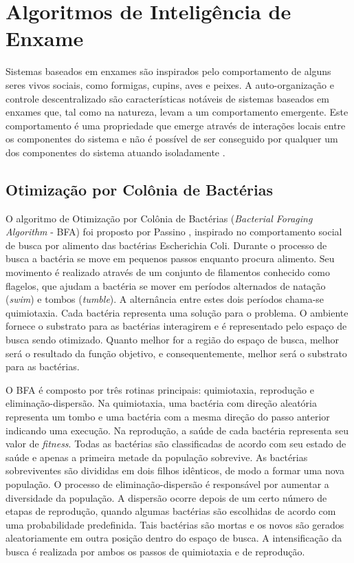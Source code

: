 \section{Algoritmos de Inteligência de Enxame}
\label{sec:swarm_intelligence_algorithms}
Sistemas baseados em enxames são inspirados pelo comportamento de alguns seres vivos sociais, como formigas, cupins, aves e peixes. A auto-organização e controle descentralizado são características notáveis de sistemas baseados em enxames que, tal como na natureza, levam a um comportamento emergente. Este comportamento é uma propriedade que emerge através de interações locais entre os componentes do sistema e não é possível de ser conseguido por qualquer um dos componentes do sistema atuando isoladamente \cite{garnier2007biological}.

\subsection{Otimização por Colônia de Bactérias}
\label{sec:biomimicry_bacterial_foraging}
O algoritmo de Otimização por Colônia de Bactérias (\textit{Bacterial Foraging Algorithm} - BFA) foi proposto por Passino \cite{passino2002biomimicry}, inspirado no comportamento social de busca por alimento das bactérias Escherichia Coli. Durante o processo de busca a bactéria se move em pequenos passos enquanto procura alimento. Seu movimento é realizado através de um conjunto de filamentos conhecido como flagelos, que ajudam a bactéria se mover em períodos alternados de natação (\textit{swim}) e tombos (\textit{tumble}). A alternância entre estes dois períodos chama-se quimiotaxia. Cada bactéria representa uma solução para o problema. O ambiente fornece o substrato para as bactérias interagirem e é representado pelo espaço de busca sendo otimizado. Quanto melhor for a região do espaço de busca, melhor será o resultado da função objetivo, e consequentemente, melhor será o substrato para as bactérias.

O BFA é composto por três rotinas principais: quimiotaxia, reprodução e eliminação-dispersão. Na quimiotaxia, uma bactéria com direção aleatória representa um tombo e uma bactéria com a mesma direção do passo anterior indicando uma execução. Na reprodução, a saúde de cada bactéria representa seu valor de \textit{fitness}. Todas as bactérias são classificadas de acordo com seu estado de saúde e apenas a primeira metade da população sobrevive. As bactérias sobreviventes são divididas em dois filhos idênticos, de modo a formar uma nova população. O processo de eliminação-dispersão é responsável por aumentar a diversidade da população. A dispersão ocorre depois de um certo número de etapas de reprodução, quando algumas bactérias são escolhidas de acordo com uma probabilidade predefinida. Tais bactérias são mortas e os novos são gerados aleatoriamente em outra posição dentro do espaço de busca. A intensificação da busca é realizada por ambos os passos de quimiotaxia e de reprodução.

